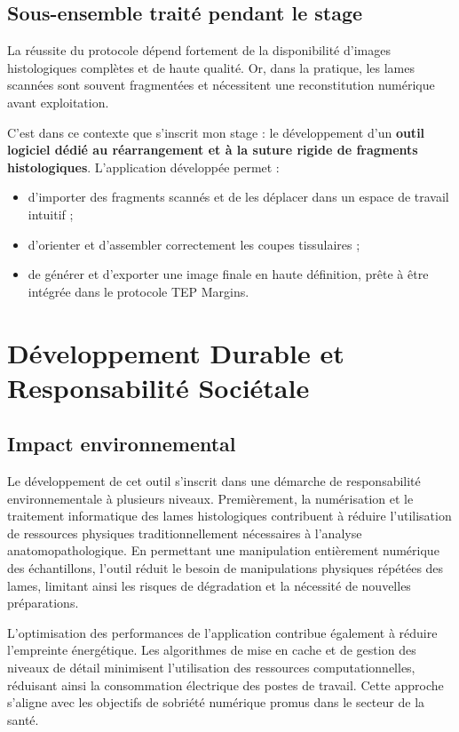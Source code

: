 \documentclass[12pt,a4paper]{report}
\begin{document}
\section{Sous-ensemble traité pendant le stage}

La réussite du protocole dépend fortement de la disponibilité d'images histologiques complètes et de haute qualité. Or, dans la pratique, les lames scannées sont souvent fragmentées et nécessitent une reconstitution numérique avant exploitation.

C'est dans ce contexte que s'inscrit mon stage : le développement d'un \textbf{outil logiciel dédié au réarrangement et à la suture rigide de fragments histologiques}. L'application développée permet :

\begin{itemize}
\item d'importer des fragments scannés et de les déplacer dans un espace de travail intuitif ;
\item d'orienter et d'assembler correctement les coupes tissulaires ;
\item de générer et d'exporter une image finale en haute définition, prête à être intégrée dans le protocole TEP Margins.
\end{itemize}



\chapter{Développement Durable et Responsabilité Sociétale}

\section{Impact environnemental}

Le développement de cet outil s'inscrit dans une démarche de responsabilité environnementale à plusieurs niveaux. Premièrement, la numérisation et le traitement informatique des lames histologiques contribuent à réduire l'utilisation de ressources physiques traditionnellement nécessaires à l'analyse anatomopathologique. En permettant une manipulation entièrement numérique des échantillons, l'outil réduit le besoin de manipulations physiques répétées des lames, limitant ainsi les risques de dégradation et la nécessité de nouvelles préparations.

L'optimisation des performances de l'application contribue également à réduire l'empreinte énergétique. Les algorithmes de mise en cache et de gestion des niveaux de détail minimisent l'utilisation des ressources computationnelles, réduisant ainsi la consommation électrique des postes de travail. Cette approche s'aligne avec les objectifs de sobriété numérique promus dans le secteur de la santé.
\end{document}
